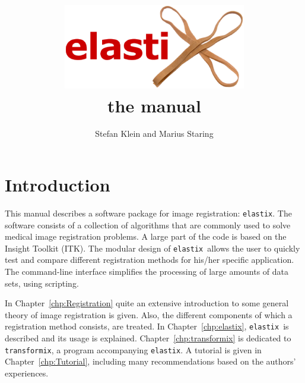 \documentclass[]{report}
\newcommand{\elastix}{\texttt{elastix}}
\newcommand{\transformix}{\texttt{transformix}}
\begin{document}
\title{\includegraphics[width=8cm]{elastixLogo.eps}\\\vspace{1cm}the manual\vspace{1cm}}
\author{Stefan Klein and Marius Staring}
\maketitle

\setcounter{page}{1}  \tableofcontents
\newpage
{} \setcounter{page}{1}


\chapter{Introduction}\label{chp:Introduction}

This manual describes a software package for image registration:
\elastix. The software consists of a collection of algorithms that
are commonly used to solve medical image registration problems. A
large part of the code is based on the Insight Toolkit (ITK). The
modular design of \elastix\ allows the user to quickly test and
compare different registration methods for his/her specific
application. The command-line interface simplifies the processing
of large amounts of data sets, using scripting.

In Chapter~\ref{chp:Registration} quite an extensive introduction to
some general theory of image registration is given. Also, the
different components of which a registration method consists, are
treated. In Chapter~\ref{chp:elastix}, \elastix\ is described and its
usage is explained. Chapter~\ref{chp:transformix} is dedicated to
\transformix, a program accompanying \elastix. A tutorial is given in
Chapter~\ref{chp:Tutorial}, including many recommendations based on
the authors' experiences.

\end{document}

